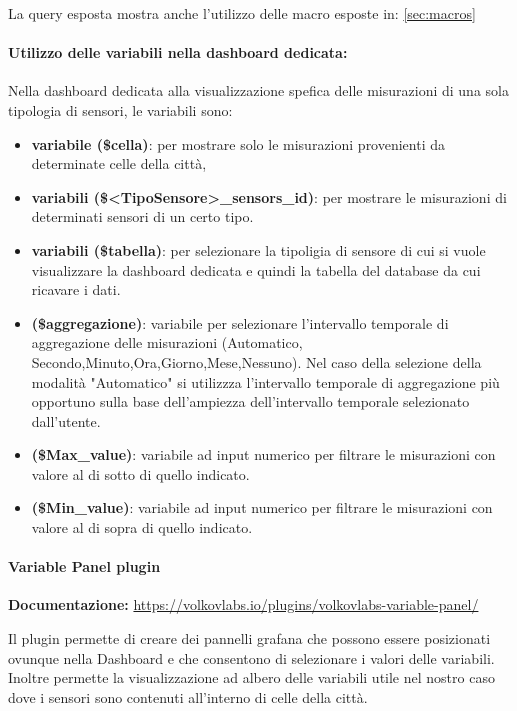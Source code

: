 La query esposta mostra anche l'utilizzo delle macro esposte in: \ref{sec:macros}
\paragraph*{Utilizzo delle variabili nella dashboard dedicata:} \label{sec:var_dedicate}
Nella dashboard dedicata alla visualizzazione spefica delle misurazioni di una sola tipologia di sensori, le variabili sono:
\begin{itemize}
    \item \textbf{variabile (\$cella)}: per mostrare solo le misurazioni provenienti da determinate celle della città, 
    \item \textbf{variabili (\$<TipoSensore>\_sensors\_id)}: per mostrare le misurazioni di determinati sensori di un certo tipo.
    \item \textbf{variabili (\$tabella)}: per selezionare la tipoligia di sensore di cui si vuole visualizzare la dashboard dedicata e quindi la tabella del database da cui ricavare i dati.
    \item \textbf{(\$aggregazione)}: variabile per selezionare l'intervallo temporale di aggregazione delle misurazioni
    (Automatico, Secondo,Minuto,Ora,Giorno,Mese,Nessuno).
    Nel caso della selezione della modalità "Automatico" si utilizzza l'intervallo temporale di aggregazione più opportuno sulla base dell'ampiezza dell'intervallo temporale selezionato dall'utente.
    \item \textbf{(\$Max\_value)}: variabile ad input numerico per filtrare le misurazioni con valore al di sotto di quello indicato.
    \item \textbf{(\$Min\_value)}: variabile ad input numerico per filtrare le misurazioni con valore al di sopra di quello indicato.
\end{itemize}
\paragraph{Variable Panel plugin}
\textbf{Documentazione:}
\href{https://volkovlabs.io/plugins/volkovlabs-variable-panel/}{https://volkovlabs.io/plugins/volkovlabs-variable-panel/}


Il plugin permette di creare dei pannelli grafana che possono essere posizionati ovunque nella Dashboard e che consentono di selezionare i valori delle variabili.
Inoltre permette la visualizzazione ad albero delle variabili utile nel nostro caso dove i sensori sono contenuti all'interno di celle della città.

